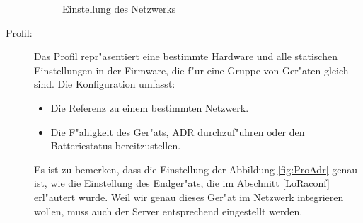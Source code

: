 \begin{description}
	\begin{figure}[h!]
		\centering
		\caption{Einstellung des Netzwerks}
	\end{figure}

	\item[Profil:] Das Profil repr"asentiert eine bestimmte Hardware und
	alle statischen Einstellungen in der Firmware, die f"ur eine Gruppe
	von Ger"aten gleich sind. Die Konfiguration umfasst:
	\begin{itemize}
		\item Die Referenz zu einem bestimmten Netzwerk.
		\item Die F"ahigkeit des Ger"ats, \ac{ADR} 
		durchzuf"uhren oder den Batteriestatus bereitzustellen.
	\end{itemize} 
	Es ist zu bemerken, dass die Einstellung der Abbildung
	\ref{fig:ProAdr} genau ist, wie die Einstellung des Endger"ats, die
	im Abschnitt \ref{LoRaconf} erl"autert wurde. Weil wir genau dieses
	Ger"at im Netzwerk integrieren wollen, muss auch der Server
	entsprechend eingestellt werden.


\end{description}
